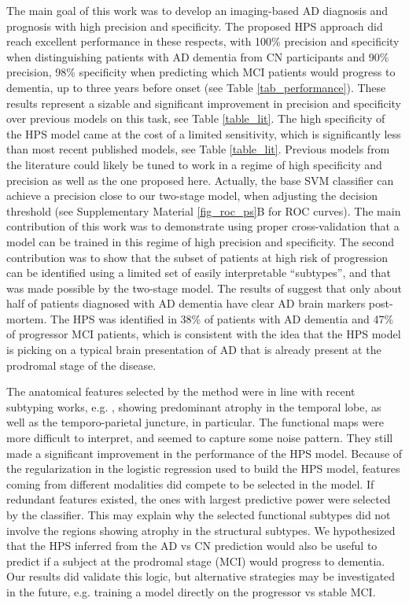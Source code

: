 \documentclass[authoryear]{elsarticle}
\begin{document}
The main goal of this work was to develop an imaging-based AD diagnosis and prognosis with high precision and specificity. The proposed HPS approach did reach excellent performance in these respects, with 100\% precision and specificity when distinguishing patients with AD dementia from CN participants and 90\% precision, 98\% specificity when predicting which MCI patients would progress to dementia, up to three years before onset (see Table \ref{tab_performance}). These results represent a sizable and significant improvement in precision and specificity over previous models on this task, see Table \ref{table_lit}. The high specificity of the HPS model came at the cost of a limited sensitivity, which is significantly less than most recent published models, see Table \ref{table_lit}. Previous models from the literature could likely be tuned to work in a regime of high specificity and precision as well as the one proposed here. Actually, the base SVM classifier can achieve a precision close to our two-stage model, when adjusting the decision threshold (see Supplementary Material \ref{fig_roc_ps}B for ROC curves). The main contribution of this work was to demonstrate using proper cross-validation that a model can be trained in this regime of high precision and specificity. The second contribution was to show that the subset of patients at high risk of progression can be identified using a limited set of easily interpretable ``subtypes'', and that was made possible by the two-stage model. The results of \citep{Beach2012} suggest that only about half of patients diagnosed with AD dementia have clear AD brain markers post-mortem. The HPS was identified in 38\% of patients with AD dementia and 47\% of progressor MCI patients, which is consistent with the idea that the HPS model is picking on a typical brain presentation of AD that is already present at the prodromal stage of the disease.

The anatomical features selected by the method were in line with recent subtyping works, e.g. \citep{Hwang2015}, showing predominant atrophy in the temporal lobe, as well as the temporo-parietal juncture, in particular. The functional maps were more difficult to interpret, and seemed to capture some noise pattern. They still made a significant improvement in the performance of the HPS model. Because of the regularization in the logistic regression used to build the HPS model, features coming from different modalities did compete to be selected in the model. If redundant features existed, the ones with largest predictive power were selected by the classifier. This may explain why the selected functional subtypes did not involve the regions showing atrophy in the structural subtypes. We hypothesized that the HPS inferred from the AD vs CN prediction would also be useful to predict if a subject at the prodromal stage (MCI) would progress to dementia. Our results did validate this logic, but alternative strategies may be investigated in the future, e.g. training a model directly on the progressor vs stable MCI. 
\end{document}
